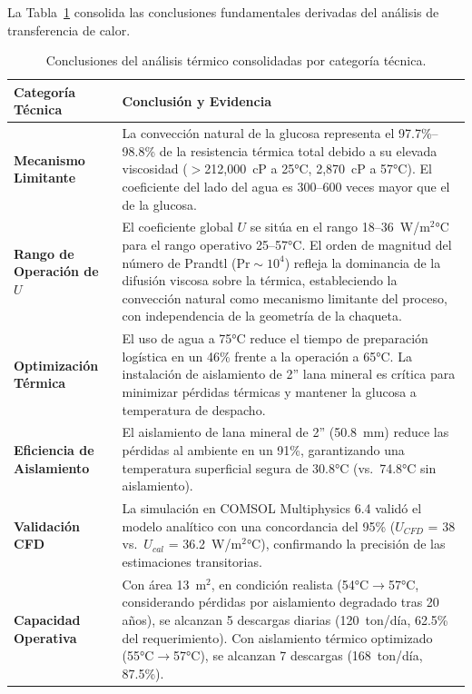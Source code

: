 La Tabla~\ref{tab:resumen_conclusiones_termicas} consolida las conclusiones fundamentales derivadas del análisis de transferencia de calor.

\begin{table}[H]
\centering
\caption{Conclusiones del análisis térmico consolidadas por categoría técnica.}
\label{tab:resumen_conclusiones_termicas}
\setcounter{itemcount}{0}
\begin{tabularx}{\textwidth}{@{}lX@{}}
\toprule
\textbf{Categoría Técnica} & \textbf{Conclusión y Evidencia} \\
\midrule
\textbf{Mecanismo Limitante} & La convección natural de la glucosa representa el 97.7\%--98.8\% de la resistencia térmica total debido a su elevada viscosidad ($>$212,000~cP a 25°C, 2,870~cP a 57°C). El coeficiente del lado del agua es 300--600 veces mayor que el de la glucosa. \\
\midrule
\textbf{Rango de Operación de $U$} & El coeficiente global $U$ se sitúa en el rango 18--36~W/m$^2$°C para el rango operativo 25--57°C. El orden de magnitud del número de Prandtl ($\mathrm{Pr} \sim 10^4$) refleja la dominancia de la difusión viscosa sobre la térmica, estableciendo la convección natural como mecanismo limitante del proceso, con independencia de la geometría de la chaqueta. \\
\midrule
\textbf{Optimización Térmica} & El uso de agua a 75°C reduce el tiempo de preparación logística en un 46\% frente a la operación a 65°C. La instalación de aislamiento de 2'' lana mineral es crítica para minimizar pérdidas térmicas y mantener la glucosa a temperatura de despacho. \\
\midrule
\textbf{Eficiencia de Aislamiento} & El aislamiento de lana mineral de 2'' (50.8~mm) reduce las pérdidas al ambiente en un 91\%, garantizando una temperatura superficial segura de 30.8°C (vs.~74.8°C sin aislamiento). \\
\midrule
\textbf{Validación CFD} & La simulación en COMSOL Multiphysics 6.4 validó el modelo analítico con una concordancia del 95\% ($U_{CFD}$ = 38 vs.~$U_{cal}$ = 36.2~W/m$^2$°C), confirmando la precisión de las estimaciones transitorias. \\
\midrule
\textbf{Capacidad Operativa} & Con área 13~m$^2$, en condición realista (54°C$\rightarrow$57°C, considerando pérdidas por aislamiento degradado tras 20 años), se alcanzan 5 descargas diarias (120~ton/día, 62.5\% del requerimiento). Con aislamiento térmico optimizado (55°C$\rightarrow$57°C), se alcanzan 7 descargas (168~ton/día, 87.5\%). \\
\bottomrule
\end{tabularx}
\end{table}


